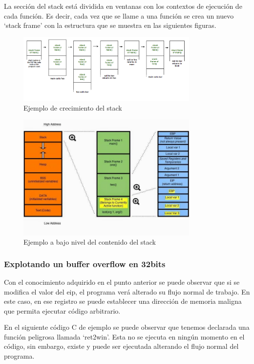 La sección del stack está dividida en ventanas con los contextos de ejecución de cada función. Es decir, cada vez que se llame a una función se crea un nuevo `stack frame' con la estructura que se muestra en las siguientes figuras.

\begin{figure}[htb!]
    \centering                        
    \includegraphics[width=0.8\textwidth]{images/stack-funcs.png}
    \caption{Ejemplo de crecimiento del stack}
    \label{fig:stack-funcs}
\end{figure}
\FloatBarrier
\begin{figure}[htb!]
    \centering                        
    \includegraphics[width=0.8\textwidth]{images/stack-arch.jpg}
    \caption{Ejemplo a bajo nivel del contenido del stack }
    \label{fig:stack-arch}
\end{figure}
\FloatBarrier
\subsubsection{Explotando un buffer overflow en 32bits}
Con el conocimiento adquirido en el punto anterior se puede observar que si se modifica el valor del \acrshort{eip}, el programa verá alterado su flujo normal de trabajo. En este caso, en ese registro se puede establecer una dirección de memoria maligna que permita ejecutar código arbitrario.

En el siguiente código C de ejemplo se puede observar que tenemos declarada una función peligrosa llamada `ret2win'. Esta no se ejecuta en ningún momento en el código, sin embargo, existe y puede ser ejecutada alterando el flujo normal del programa.

